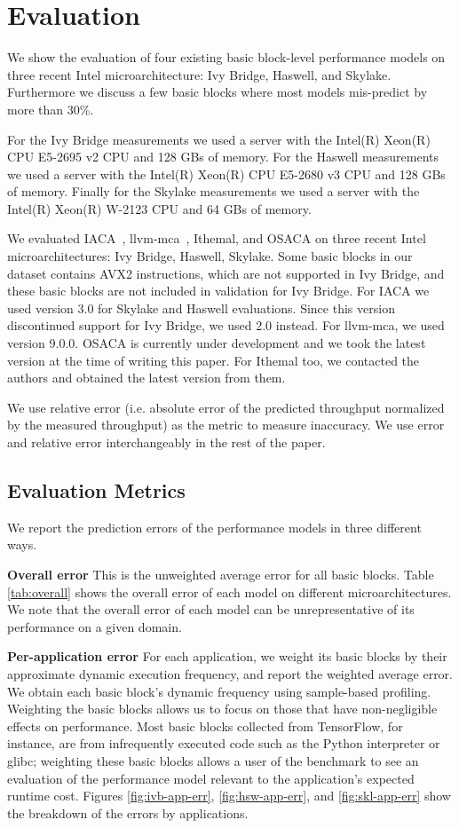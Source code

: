 \section{Evaluation}
We show the evaluation of four existing basic block-level
performance models on three recent Intel microarchitecture:
Ivy Bridge, Haswell, and Skylake. Furthermore we discuss a few basic blocks where most models
mis-predict by more than 30\%.

For the Ivy Bridge measurements we used a server with the Intel(R) Xeon(R) CPU E5-2695 v2 CPU and 128 GBs of memory. 
For the Haswell measurements we used a server with the Intel(R) Xeon(R) CPU E5-2680 v3 CPU and 128 GBs of memory. 
Finally for the Skylake measurements we used a server with the Intel(R) Xeon(R) W-2123 CPU and 64 GBs of memory. 

We evaluated IACA~\cite{iaca}, llvm-mca~\cite{llvm-mca}, Ithemal\cite{ithemal}, and OSACA\cite{osaca}
on three recent Intel microarchitectures: Ivy Bridge, Haswell, Skylake.
Some basic blocks in our dataset contains AVX2 instructions, which are not supported in Ivy Bridge,
and these basic blocks are not included in validation for Ivy Bridge.
For IACA we used version 3.0 for Skylake and Haswell evaluations. Since this version discontinued support for Ivy Bridge, we used 2.0 instead.
For llvm-mca, we used version 9.0.0. OSACA is currently under development and we took the latest version at the time of writing this paper. For Ithemal too, we contacted the authors and obtained the latest version from them. 

We use relative error (i.e. absolute error of the predicted throughput normalized by the measured throughput)
as the metric to measure inaccuracy.
We use error and relative error interchangeably in the rest of the paper.

\subsection{Evaluation Metrics}\label{results}
We report the prediction errors of the performance models in three different ways.

\textbf{Overall error} This is the unweighted average error for all basic blocks.
Table \ref{tab:overall} shows the overall error of each model on different microarchitectures.
We note that the overall error of each model can be unrepresentative
of its performance on a given domain.

\textbf{Per-application error}
For each application, we weight its basic blocks by their approximate
dynamic execution frequency,
and report the weighted average error.
We obtain each basic block's dynamic frequency using sample-based profiling.
Weighting the basic blocks allows us to focus on those that have
non-negligible effects on performance.
Most basic blocks collected from TensorFlow\cite{tensorflow},
for instance, are from infrequently executed code 
such as the Python interpreter or glibc;
weighting these basic blocks allows a user of the benchmark
to see an evaluation  of the performance model relevant
to the application's expected runtime cost.
Figures \ref{fig:ivb-app-err}, \ref{fig:hsw-app-err}, and \ref{fig:skl-app-err}
show the breakdown of the errors by applications.

